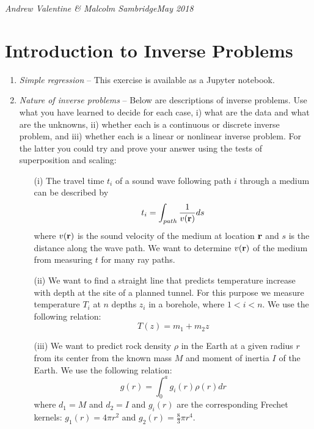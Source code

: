 \documentclass[a4paper,11pt]{article}
\begin{document}
\reversemarginpar
\textit{Andrew Valentine \& Malcolm Sambridge\hfill May 2018}
\section{Introduction to Inverse Problems}
\begin{enumerate}
\item \label{q:curvefit}\textit{Simple regression} -- This exercise is available as a Jupyter notebook.
\item \textit{Nature of inverse problems} -- Below are descriptions of inverse problems. Use what you have learned to decide for each case, i) what are the data and what are the unknowns, ii) whether each is a continuous or discrete inverse problem, and iii) whether each is a linear or nonlinear inverse problem. For the latter you could try and prove your answer using the tests of superposition and scaling:
\begin{enumerate}
  \item[(i)] The travel time $t_i$ of a sound wave following path $i$ through a medium can be described by
\begin{equation*}
t_i = \int_{path}{1\over v({\bf r})} ds
\end{equation*}
where $v({\bf r})$ is the sound velocity of the medium at location ${\bf r}$ and $s$ is the distance along the wave path. We want to determine $v({\bf r})$ of the medium from measuring $t$ for many ray paths. 
   \item[(ii)] We want to find a straight line that predicts temperature increase with depth at the site of a planned tunnel. For this purpose we measure temperature $T_i$ at $n$ depths $z_i$ in a borehole, where $1 < i < n$. 
We use the following relation: 
\begin{equation*}
T(z) = m_1 + m_2z
\end{equation*}

   \item[(iii)]We want to predict rock density $\rho$ in the Earth at a given radius $r$ from its center from the known mass $M$ and moment of inertia $I$ of the Earth. We use the following relation: 
\begin{equation*}
g(r) = \int_0^a g_i(r)\rho(r)dr
\end{equation*}
where $d_1 = M$ and $d_2 = I$ and $g_i(r)$ are the corresponding Frechet kernels: $g_1(r) = 4 \pi r^2$ and 
$g_2(r) = \frac{8}{3} \pi r^4$. 


\end{enumerate}
\end{enumerate}
\end{document}
